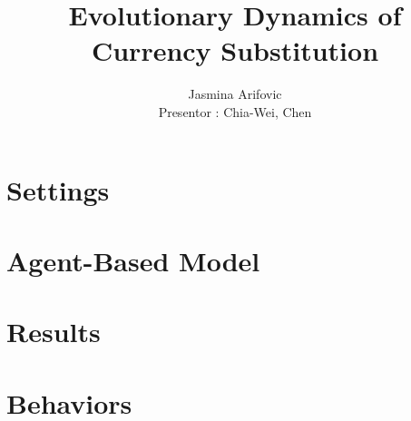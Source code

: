 \documentclass[mathserif]{beamer}
\title{Evolutionary Dynamics of Currency Substitution}
\author{Jasmina Arifovic \\ {\small Presentor : Chia-Wei, Chen}}
\begin{document}
    \begin{frame}

        \maketitle

    \end{frame}

    \section{Settings}
    

    \section{Agent-Based Model}
    

    \section{Results}
    

    \section{Behaviors}
    
\end{document}
